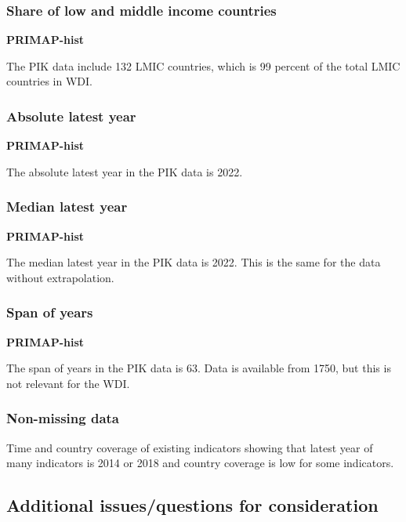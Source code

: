 \documentclass[
  letterpaper,
  DIV=11,
  numbers=noendperiod]{scrartcl}
\begin{document}
\hypertarget{share-of-low-and-middle-income-countries}{%
\subsubsection{Share of low and middle income
countries}\label{share-of-low-and-middle-income-countries}}

\textbf{PRIMAP-hist}

The PIK data include 132 LMIC countries, which is 99 percent of the
total LMIC countries in WDI.

\hypertarget{absolute-latest-year}{%
\subsubsection{Absolute latest year}\label{absolute-latest-year}}

\textbf{PRIMAP-hist}

The absolute latest year in the PIK data is 2022.

\hypertarget{median-latest-year}{%
\subsubsection{Median latest year}\label{median-latest-year}}

\textbf{PRIMAP-hist}

The median latest year in the PIK data is 2022. This is the same for the
data without extrapolation.

\hypertarget{span-of-years}{%
\subsubsection{Span of years}\label{span-of-years}}

\textbf{PRIMAP-hist}

The span of years in the PIK data is 63. Data is available from 1750,
but this is not relevant for the WDI.

\hypertarget{non-missing-data}{%
\subsubsection{Non-missing data}\label{non-missing-data}}

Time and country coverage of existing indicators showing that latest
year of many indicators is 2014 or 2018 and country coverage is low for
some indicators.

\hypertarget{additional-issuesquestions-for-consideration}{%
\subsection{Additional issues/questions for
consideration}\label{additional-issuesquestions-for-consideration}}
\end{document}
